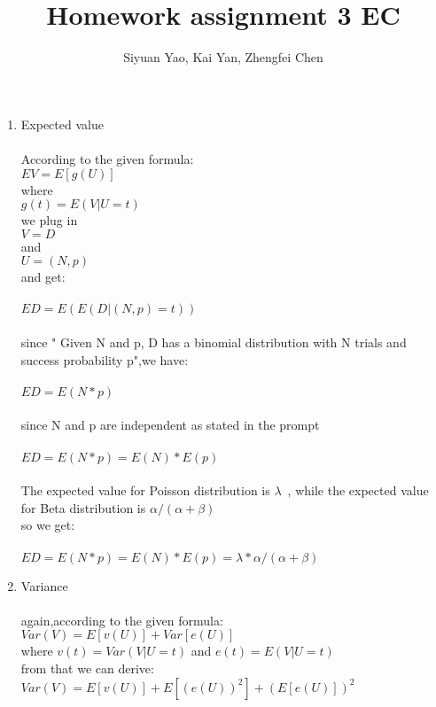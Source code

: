 \documentclass{amsart}
\begin{document}
\title{Homework assignment 3 EC}
\author{Siyuan Yao, Kai Yan, Zhengfei Chen}
\maketitle

\thispagestyle{empty}
\pagestyle{empty}

\begin{enumerate}
\item Expected value\\\\
According to the given formula:\\
$ EV = E[g(U)]$\\
where \\$g(t) = E(V | U = t)$\\
we plug in \\$V = D $\\and \\$U = (N,p)$\\
and get:\\
\\$ED = E(E(D|(N,p)=t))$\\\\
since " Given N and p, D has a binomial distribution with N trials and success probability p",we have:\\
\\$ED = E(N*p)$\\\\
since N and p are independent as stated in the prompt\\
\\$ED = E(N*p)=E(N)*E(p)$\\\\
The expected value for Poisson distribution is $\lambda$\ , while the expected value for Beta distribution is $\alpha / (\alpha + \beta)$\\
so we get:\\
\\$ED = E(N*p)=E(N)*E(p)=\lambda*\alpha / (\alpha + \beta)$
\newpage
\item Variance\\\\
again,according to the given formula:\\
$Var(V) = E[v(U)] + Var[e(U)]$\\
where $v(t) = Var(V | U = t)$ and $e(t) = E(V | U = t) $\\
from that we can derive:\\
$Var(V)= E[v(U)] + E[(e(U))^2] + (E[e(U)])^2$\\

\end{enumerate}
\end{document}
